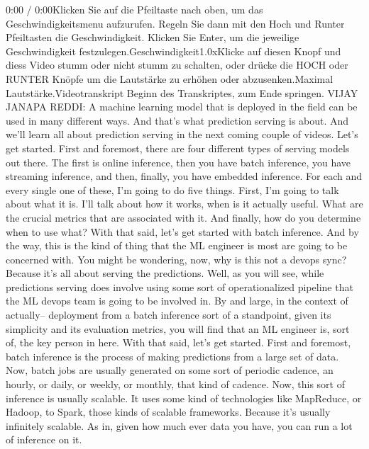 {{{{{{{    0:00 / 0:00Klicken Sie auf die Pfeiltaste nach oben, um das Geschwindigkeitsmenu aufzurufen. Regeln Sie dann mit den Hoch und Runter Pfeiltasten die Geschwindigkeit. Klicken Sie Enter, um die jeweilige Geschwindigkeit festzulegen.Geschwindigkeit1.0xKlicke auf diesen Knopf und diess Video stumm oder nicht stumm zu schalten, oder drücke die HOCH oder RUNTER Knöpfe um die Lautstärke zu erhöhen oder abzusenken.Maximal Lautstärke.Videotranskript
    Beginn des Transkriptes, zum Ende springen.
    VIJAY JANAPA REDDI: A machine learning model that is deployed in the field
    can be used in many different ways.
    And that's what prediction serving is about.
    And we'll learn all about prediction serving
    in the next coming couple of videos.
    Let's get started.
    First and foremost, there are four different types
    of serving models out there.
    The first is online inference, then you have batch inference,
    you have streaming inference, and then, finally, you have embedded inference.
    For each and every single one of these, I'm going to do five things.
    First, I'm going to talk about what it is.
    I'll talk about how it works, when is it actually useful.
    What are the crucial metrics that are associated with it.
    And finally, how do you determine when to use what?
    With that said, let's get started with batch inference.
    And by the way, this is the kind of thing
    that the ML engineer is most are going to be concerned with.
    You might be wondering, now, why is this not a devops sync?
    Because it's all about serving the predictions.
    Well, as you will see, while predictions serving does
    involve using some sort of operationalized pipeline
    that the ML devops team is going to be involved in.
    By and large, in the context of actually-- deployment
    from a batch inference sort of a standpoint,
    given its simplicity and its evaluation metrics,
    you will find that an ML engineer is, sort of, the key person in here.
    With that said, let's get started.
    First and foremost, batch inference is the process of making predictions
    from a large set of data.
    Now, batch jobs are usually generated on some sort
    of periodic cadence, an hourly, or daily, or weekly, or monthly,
    that kind of cadence.
    Now, this sort of inference is usually scalable.
    It uses some kind of technologies like MapReduce, or Hadoop,
    to Spark, those kinds of scalable frameworks.
    Because it's usually infinitely scalable.
    As in, given how much ever data you have, you can run a lot of inference
    on it.
}}}}}}}
